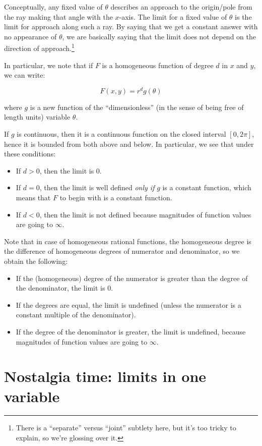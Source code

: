 \documentclass[10pt]{amsart}
\begin{document}
Conceptually, any fixed value of $\theta$ describes an approach to the
origin/pole from the ray making that angle with the $x$-axis. The
limit for a fixed value of $\theta$ is the limit for approach along
such a ray. By saying that we get a constant answer with no appearance
of $\theta$, we are basically saying that the limit does not depend on
the direction of approach.\footnote{There is a ``separate'' versus
``joint'' subtlety here, but it's too tricky to explain, so we're
glossing over it.}

In particular, we note that if $F$ is a homogeneous function of degree
$d$ in $x$ and $y$, we can write:

$$F(x,y) = r^dg(\theta)$$

where $g$ is a new function of the ``dimensionless'' (in the sense of
being free of length units) variable $\theta$.

If $g$ is continuous, then it is a continuous function on the closed
interval $[0,2\pi]$, hence it is bounded from both above and below. In
particular, we see that under these conditions:

\begin{itemize}
\item If $d > 0$, then the limit is $0$.
\item If $d = 0$, then the limit is well defined {\em only if} $g$ is
  a constant function, which means that $F$ to begin with is a
  constant function.
\item If $d < 0$, then the limit is not defined because magnitudes of
  function values are going to $\infty$.
\end{itemize}

Note that in case of homogeneous rational functions, the homogeneous
degree is the difference of homogeneous degrees of numerator and
denominator, so we obtain the following:

\begin{itemize}
\item If the (homogeneous) degree of the numerator is greater than the
  degree of the denominator, the limit is $0$.
\item If the degrees are equal, the limit is undefined (unless the
  numerator is a constant multiple of the denominator).
\item If the degree of the denominator is greater, the limit is
  undefined, because magnitudes of function values are going to
  $\infty$.
\end{itemize}

\section{Nostalgia time: limits in one variable}
\end{document}
